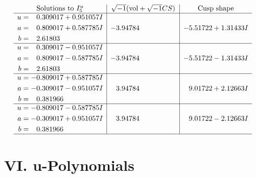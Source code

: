 \documentclass[1p]{elsarticle_modified}
\theoremstyle{definition}
\newcommand{\I}{\sqrt{-1}}
\begin{document}
$$\begin{array}{c|c|c}  
\text{Solutions to }I^u_{5}& \I (\text{vol} + \sqrt{-1}CS) & \text{Cusp shape}\\
 \hline 
\begin{aligned}
u &= \phantom{-}0.309017 + 0.951057 I \\
a &= \phantom{-}0.809017 + 0.587785 I \\
b &= \phantom{-}2.61803\phantom{ +0.000000I}\end{aligned}
 & -3.94784\phantom{ +0.000000I} & -5.51722 + 1.31433 I \\ \hline\begin{aligned}
u &= \phantom{-}0.309017 - 0.951057 I \\
a &= \phantom{-}0.809017 - 0.587785 I \\
b &= \phantom{-}2.61803\phantom{ +0.000000I}\end{aligned}
 & -3.94784\phantom{ +0.000000I} & -5.51722 - 1.31433 I \\ \hline\begin{aligned}
u &= -0.809017 + 0.587785 I \\
a &= -0.309017 - 0.951057 I \\
b &= \phantom{-}0.381966\phantom{ +0.000000I}\end{aligned}
 & \phantom{-}3.94784\phantom{ +0.000000I} & \phantom{-}9.01722 + 2.12663 I \\ \hline\begin{aligned}
u &= -0.809017 - 0.587785 I \\
a &= -0.309017 + 0.951057 I \\
b &= \phantom{-}0.381966\phantom{ +0.000000I}\end{aligned}
 & \phantom{-}3.94784\phantom{ +0.000000I} & \phantom{-}9.01722 - 2.12663 I\\
 \hline 
 \end{array}$$\newpage
\newpage\renewcommand{\arraystretch}{1}
\centering \section*{ VI. u-Polynomials}
\end{document}
